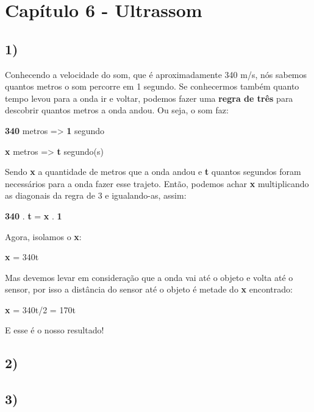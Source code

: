  

\section*{Capítulo 6 - Ultrassom}

    \subsection*{1)}
    
        Conhecendo a velocidade do som, que é aproximadamente 340 m/s, nós sabemos quantos metros o som percorre em 1 segundo.
        Se conhecermos também quanto tempo levou para a onda ir e voltar, podemos fazer uma \textbf{regra de três} para descobrir quantos metros a onda andou.
        Ou seja, o som faz: 
        \par
        \textbf{340} metros => \textbf{1} segundo 
        \par
        \textbf{x} metros => \textbf{t} segundo(s) \par
        Sendo \textbf{x} a quantidade de metros que a onda andou e \textbf{t} quantos segundos foram necessários para a onda fazer esse trajeto.
        Então, podemos achar \textbf{x} multiplicando as diagonais da regra de 3 e igualando-as, assim: 
        \par
        \textbf{340} . \textbf{t} = \textbf{x} . \textbf{1} 
        \par
        Agora, isolamos o \textbf{x}:
        \par
        \textbf{x} = 340t
        \par
        Mas devemos levar em consideração que a onda vai até o objeto e volta até o sensor, por isso a distância do sensor até o objeto é metade do \textbf{x} encontrado:
        \par
        \textbf{x} = 340t/2 = 170t
        \par
        E esse é o nosso resultado!
    
    \subsection*{2)}
    
 

    \subsection*{3)}
    
